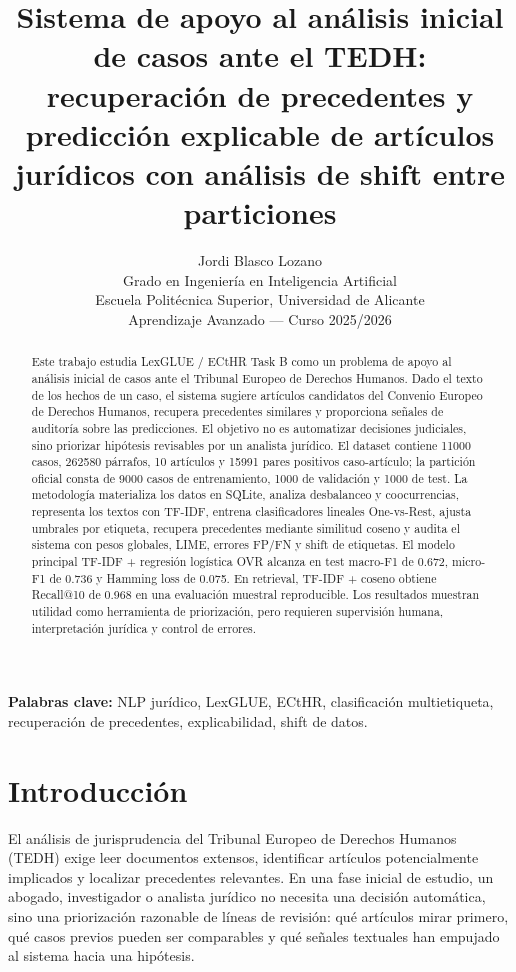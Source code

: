 \documentclass[11pt,a4paper]{article}
\title{\textbf{Sistema de apoyo al análisis inicial de casos ante el TEDH:}\\
\large recuperación de precedentes y predicción explicable de artículos jurídicos con análisis de shift entre particiones}
\author{
    Jordi Blasco Lozano\\
    \small Grado en Ingeniería en Inteligencia Artificial\\
    \small Escuela Politécnica Superior, Universidad de Alicante\\
    \small Aprendizaje Avanzado --- Curso 2025/2026
}
\date{}
\begin{document}
\maketitle

\begin{abstract}
Este trabajo estudia LexGLUE / ECtHR Task B como un problema de apoyo al análisis inicial de casos ante el Tribunal Europeo de Derechos Humanos. Dado el texto de los hechos de un caso, el sistema sugiere artículos candidatos del Convenio Europeo de Derechos Humanos, recupera precedentes similares y proporciona señales de auditoría sobre las predicciones. El objetivo no es automatizar decisiones judiciales, sino priorizar hipótesis revisables por un analista jurídico. El dataset contiene 11000 casos, 262580 párrafos, 10 artículos y 15991 pares positivos caso-artículo; la partición oficial consta de 9000 casos de entrenamiento, 1000 de validación y 1000 de test. La metodología materializa los datos en SQLite, analiza desbalanceo y coocurrencias, representa los textos con TF-IDF, entrena clasificadores lineales One-vs-Rest, ajusta umbrales por etiqueta, recupera precedentes mediante similitud coseno y audita el sistema con pesos globales, LIME, errores FP/FN y shift de etiquetas. El modelo principal TF-IDF + regresión logística OVR alcanza en test macro-F1 de 0.672, micro-F1 de 0.736 y Hamming loss de 0.075. En retrieval, TF-IDF + coseno obtiene Recall@10 de 0.968 en una evaluación muestral reproducible. Los resultados muestran utilidad como herramienta de priorización, pero requieren supervisión humana, interpretación jurídica y control de errores.
\end{abstract}

\noindent\textbf{Palabras clave:} NLP jurídico, LexGLUE, ECtHR, clasificación multietiqueta, recuperación de precedentes, explicabilidad, shift de datos.

\tableofcontents
\newpage

\section{Introducción}

El análisis de jurisprudencia del Tribunal Europeo de Derechos Humanos (TEDH) exige leer documentos extensos, identificar artículos potencialmente implicados y localizar precedentes relevantes. En una fase inicial de estudio, un abogado, investigador o analista jurídico no necesita una decisión automática, sino una priorización razonable de líneas de revisión: qué artículos mirar primero, qué casos previos pueden ser comparables y qué señales textuales han empujado al sistema hacia una hipótesis.
\end{document}
